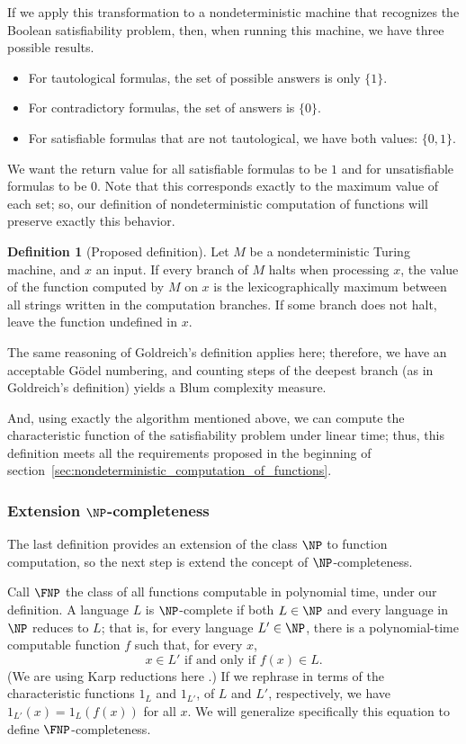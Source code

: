 \documentclass[12pt]{article}
\theoremstyle{definition}
\newtheorem{definition}{Definition}
\begin{document}
If we apply this transformation to a nondeterministic machine
that recognizes the Boolean satisfiability problem,
then, when running this machine,
we have three possible results.
\begin{itemize}
    \item For tautological formulas,
        the set of possible answers is only $\{1\}$.
    \item For contradictory formulas,
        the set of answers is $\{0\}$.
    \item For satisfiable formulas that are not tautological,
        we have both values: $\{0, 1\}$.
\end{itemize}
We want the return value for all satisfiable formulas to be $1$
and for unsatisfiable formulas to be $0$.
Note that this corresponds exactly to the maximum value of each set;
so,
our definition of nondeterministic computation of functions
will preserve exactly this behavior.

\begin{definition}[Proposed definition]
    Let $M$ be a nondeterministic Turing machine,
    and $x$ an input.
    If every branch of $M$ halts when processing $x$,
    the value of the function computed by $M$ on $x$
    is the lexicographically maximum
    between all strings written in the computation branches.
    If some branch does not halt, leave the function undefined in $x$.
\end{definition}

The same reasoning of Goldreich's definition applies here;
therefore, we have an acceptable Gödel numbering,
and counting steps of the deepest branch
(as in Goldreich's definition)
yields a Blum complexity measure.

And, using exactly the algorithm mentioned above,
we can compute the characteristic function of the satisfiability problem
under linear time;
thus, this definition meets all the requirements
proposed in the beginning of section~\ref{sec:nondeterministic_computation_of_functions}.

\subsubsection{Extension $\NP$-completeness}

The last definition provides an extension of the class $\NP$ to function computation,
so the next step is extend the concept of $\NP$-completeness.

Call $\FNP$ the class of all functions computable in polynomial time,
under our definition.
A language $L$ is $\NP$-complete if both $L \in \NP$
and every language in $\NP$ reduces to $L$;
that is, for every language $L' \in \NP$,
there is a polynomial-time computable function $f$
such that, for every $x$,
\begin{equation*}
    x \in L' \text{ if and only if } f(x) \in L.
\end{equation*}
(We are using Karp reductions here \cite[p.~42]{AroraBarak2009}.)
If we rephrase in terms of the characteristic functions $1_L$ and $1_{L'}$,
of $L$ and $L'$, respectively,
we have $1_{L'}(x) = 1_L(f(x))$ for all $x$.
We will generalize specifically this equation to define $\FNP$-completeness.
\end{document}

